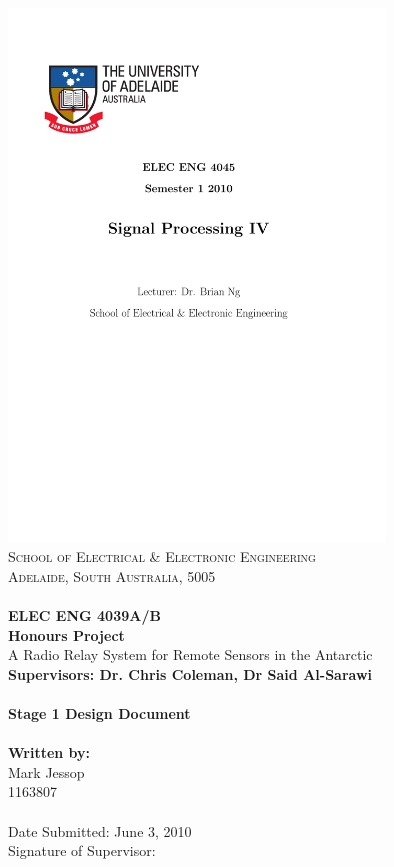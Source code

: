 \documentclass[a4paper,12pt]{article}
\begin{document}
\thispagestyle{empty}
\vspace*{\fill}
\includegraphics[width=10cm]{./UofAlogo.pdf}\\
\noindent
\textsc{
\textsc{School of Electrical \& Electronic Engineering}\\
Adelaide, South Australia, 5005\\ \\
}
\noindent
\Large{\textbf{
ELEC ENG 4039A/B \\
Honours Project\\
	}}
	\Large{
		A Radio Relay System for Remote Sensors in the Antarctic \\
	}
	\small{\textbf{Supervisors: Dr. Chris Coleman, Dr Said Al-Sarawi}}
	\ \\
	\ \\
	\Large{\textbf{
		Stage 1 Design Document \\
	}}
	\ \\
	\small{\textbf{
		Written by: \\}
		Mark Jessop \\
		1163807
	}
	\ \\
	\ \\
	Date Submitted: June 3, 2010 \\
	Signature of Supervisor: \\
 \vspace*{\fill}
\end{document}
